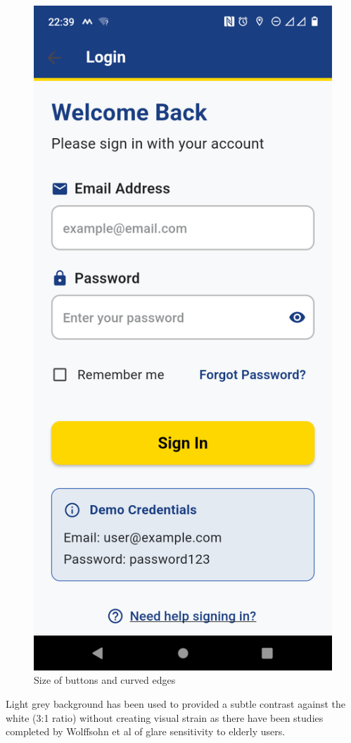 \documentclass[]{project_final}
\begin{document}
\begin{figure}[ht!]
  \centering
  \includegraphics[height=0.4\textwidth]{M Login screen.png}
  \caption{Size of buttons and curved edges}
  \label{fig:1}
\end{figure}

Light grey background has been used to provided a subtle contrast against the white (3:1 ratio) without creating visual strain as there have been studies completed by Wolffsohn et al of glare sensitivity to elderly users.
\end{document}
